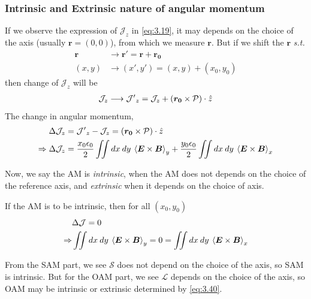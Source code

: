 \documentclass[11pt,a4paper]{article}
\numberwithin{equation}{section}
\begin{document}
\subsubsection{Intrinsic and Extrinsic nature of angular momentum}
If we observe the expression of $\mathcal{J}_z$ in \ref{eq:3.19}, it may depends on the choice of the axis (usually $\boldsymbol{r} = (0,0) $), from which we measure $\boldsymbol{r}$.\cite{WO}\cite{berry 98} But if we shift the $\boldsymbol{r}$ \textit{s.t.}
\begin{align}
	\boldsymbol{r}&\longrightarrow\boldsymbol{r'}=\boldsymbol{r}+\boldsymbol{r_0}\\
	(x,y)&\longrightarrow(x',y')=(x,y)+(x_0,y_0)
\end{align}
then change of $\mathcal{J}_z$ will be
\begin{align}
	\mathcal{J}_z\longrightarrow\mathcal{J'}_z = \mathcal{J}_z +  (\boldsymbol{r_0}\times\mathcal{P})\cdot\Hat{z}
\end{align}
The change in angular momentum,
\begin{align}
	\Delta\mathcal{J}_z&= \mathcal{J'}_z-\mathcal{J}_z = (\boldsymbol{r_0}\times\mathcal{P})\cdot\Hat{z}\\
	\Rightarrow\Delta\mathcal{J}_z&= \frac{x_0\epsilon_0}{2}\iint  dx\:dy\: \expval{\boldsymbol{E}\times\boldsymbol{B}}_y + \frac{y_0\epsilon_0}{2}\iint  dx\:dy\: \expval{\boldsymbol{E}\times\boldsymbol{B}}_x \label{}
\end{align}

Now, we say the AM is \textit{intrinsic}, when the AM does not depends on the choice of the reference axis, and \textit{extrinsic} when it depends on the choice of axis.

If the AM is to be intrinsic, then for all $(x_0,y_0)$
\begin{align}
	&\Delta\mathcal{J}=0\nonumber\\
	\Rightarrow &\iint  dx\:dy\: \expval{\boldsymbol{E}\times\boldsymbol{B}}_y = 0 = \iint  dx\:dy\: \expval{\boldsymbol{E}\times\boldsymbol{B}}_x \label{eq:3.40}
\end{align} 

From the SAM part, we see $\mathcal{S}$ does not depend on the choice of the axis, so SAM is intrinsic. But for the OAM part, we see $\mathcal{L}$ depends on the choice of the axis, so OAM may be intrinsic or extrinsic determined by \ref{eq:3.40}.

\end{document}
